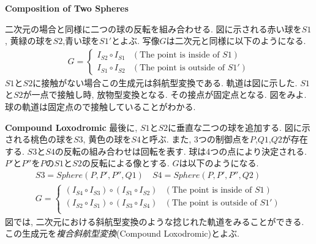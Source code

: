 \noindent\textbf{Composition of Two Spheres}

二次元の場合と同様に二つの球の反転を組み合わせる.
図に示される赤い球を$S1$, 黄緑の球を$S2$,青い球を$S1'$とよぶ.
写像$G$は二次元と同様に以下のようになる.
\begin{align*}
G =
\begin{cases}
 I_{S2} \circ I_{S1} & (\text{The point is inside of } S1) \\
 I_{S1} \circ I_{S2} & (\text{The point is outside of }S1')
\end{cases}
\end{align*}
$S1$と$S2$に接触がない場合この生成元は斜航型変換である.
軌道は図に示した.
$S1$と$S2$が一点で接触し時, 放物型変換となる.
その接点が固定点となる.
図をみよ.
球の軌道は固定点ので接触していることがわかる.

\noindent\textbf{Compound Loxodromic}
最後に, $S1$と$S2$に垂直な二つの球を追加する.
図に示される桃色の球を$S3$, 黄色の球を$S4$と呼ぶ.
また, 3つの制御点を$P$,$Q1$,$Q2$が存在する.
$S3$と$S4$の反転の組み合わせは回転を表す.
球は4つの点により決定される.
$P'$と$P''$を$P$の$S1$と$S2$の反転による像とする.
$G$は以下のようになる.
\begin{align*}
S3 = Sphere(P, P', P'', Q1) \quad
S4 = Sphere(P, P', P'', Q2) \\
G =
\begin{cases}
 (I_{S4} \circ I_{S3}) \circ (I_{S1} \circ I_{S2}) & (\text{The point is inside of } S1) \\
 (I_{S2} \circ I_{S1}) \circ (I_{S3} \circ I_{S4}) & (\text{The point is outside of }S1')\\
\end{cases}
\end{align*}
図では, 二次元における斜航型変換のような捻じれた軌道をみることができる.
この生成元を\emph{複合斜航型変換}(Compound Loxodromic)とよぶ.


